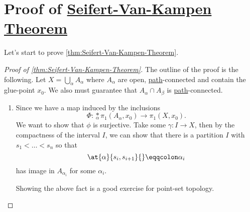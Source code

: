 \section{Proof of \hyperref[thm:Seifert-Van-Kampen-Theorem]{Seifert-Van-Kampen Theorem}}
Let's start to prove \autoref{thm:Seifert-Van-Kampen-Theorem}.
\begin{proof}[Proof of \autoref{thm:Seifert-Van-Kampen-Theorem}]\label{pf:thm:Seifert-Van-Kampen-Theorem}
	The outline of the proof is the following. Let \(X = \bigcup_{\alpha}A_\alpha \) where \(A_\alpha \) are open, \hyperref[def:path]{path}-connected
	and contain the glue-point \(x_0\). We also must guarantee that \(A_\alpha \cap A_\beta \) is \hyperref[def:path]{path}-connected.

	\begin{enumerate}
		\item Since we have a map induced by the inclusions
		      \[
			      \Phi \colon \underset{\alpha}{\ast} \pi _1(A_\alpha , x_0)\to \pi _1(X, x_0).
		      \]
		      We want to show that \(\phi \) is surjective. Take some \(\gamma \colon I\to X\), then by the compactness of the interval \(I\), we can
		      show that there is a partition \(I\) with \(s_1<\ldots <s_n \) so that
		      \[
			      \at{\alpha }{s_{i}, s_{i+1}}{} \eqqcolon \alpha _{i}
		      \]
		      has image in \(A_{\alpha_{i}}\) for some \(\alpha _{i}\).

		      \begin{exercise}
			      Showing the above fact is a good exercise for point-set topology.
		      \end{exercise}


\end{enumerate}
\end{proof}
